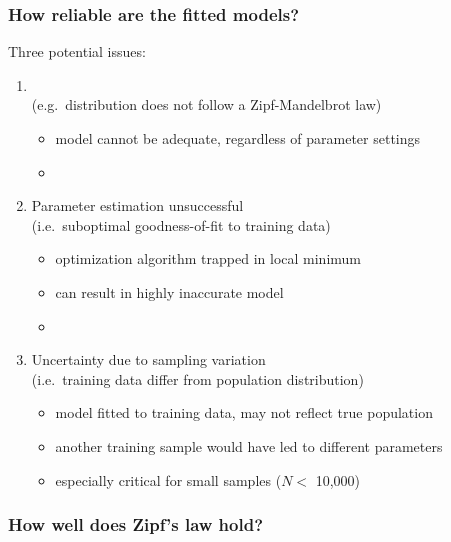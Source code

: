 \documentclass[t]{beamer} %
\begin{document}
\begin{frame}
  \frametitle{How reliable are the fitted models?}
  
  Three potential issues:
  \begin{enumerate}
  \item {}\\
    (e.g.\ distribution does not follow a Zipf-Mandelbrot law)
    \begin{itemize}
    \item[\hand] model cannot be adequate, regardless of parameter settings
    \item[]
    \end{itemize}
  \item Parameter estimation unsuccessful\\
    (i.e.\ suboptimal goodness-of-fit to training data)
    \begin{itemize}
    \item[\hand] optimization algorithm trapped in local minimum
    \item[\hand] can result in highly inaccurate model
    \item[]
    \end{itemize}
  \item Uncertainty due to sampling variation\\
    (i.e.\ training data differ from population distribution)
    \begin{itemize}
    \item[\hand] model fitted to training data, may not reflect true population
    \item[\hand] another training sample would have led to different parameters
    \item[\hand] especially critical for small samples ($N < $ 10,000)
    \end{itemize}
  \end{enumerate}
\end{frame}

\begin{frame}[c]
  \frametitle{How well does Zipf's law hold?} 

  \centering
\end{frame}
\end{document}
